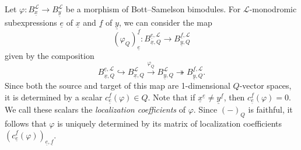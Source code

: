 \documentclass{amsart}
\newcommand{\scrL}{\mathcal{L}}
\newcommand{\ue}{\underline{e}}
\newcommand{\uf}{\underline{f}}
\newcommand{\ux}{\underline{x}}
\newcommand{\uy}{\underline{y}}
\theoremstyle{definition}
\numberwithin{equation}{subsection}
\begin{document}
Let $\varphi : B_{\ux}^{\scrL} \to B_{\uy}^{\scrL}$ be a morphism of Bott--Samelson bimodules.
For $\scrL$-monodromic subexpressions $\ue$ of $\ux$ and $\uf$ of $\uy$, we can consider the map 
\[(\varphi_Q)_{\ue}^{\uf} : B_{\ux, Q}^{\ue, \scrL} \to B_{\uy, Q}^{\uf, \scrL}\]
given by the composition
\[B_{\ux, Q}^{\ue, \scrL} \hookrightarrow B_{\ux, Q}^{\scrL} \stackrel{\varphi_Q}{\to} B_{\uy, Q}^{\scrL} \twoheadrightarrow B_{\uy, Q}^{\uf, \scrL}.\]
Since both the source and target of this map are 1-dimensional $Q$-vector spaces, it is determined by a scalar $c_{\ue}^{\uf} (\varphi) \in Q$.
Note that if $\ux^{\ue} \neq \uy^{\uf}$, then $c_{\ue}^{\uf} (\varphi) = 0$. We call these scalars the \emph{localization coefficients} of $\varphi$.
Since $(-)_Q$ is faithful, it follows that $\varphi$ is uniquely determined by its matrix of localization coefficients $\left( c_{\ue}^{\uf} (\varphi)\right)_{\ue, \uf}$.
\end{document}
